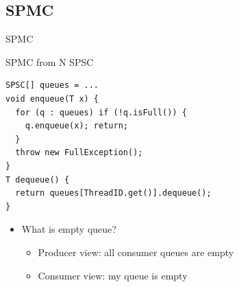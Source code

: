 \subsection{SPMC}
\showTOCSub

\begin{frame}[fragile]{SPMC}
\end{frame}


\begin{frame}[t,fragile]{SPMC from N SPSC}


\pause

\begin{verbatim}
SPSC[] queues = ...
void enqueue(T x) {
  for (q : queues) if (!q.isFull()) {
    q.enqueue(x); return;
  }
  throw new FullException();
}
T dequeue() {  
  return queues[ThreadID.get()].dequeue();  
}
\end{verbatim}

\pause
\begin{itemize}
  \item What is empty queue?
  \begin{itemize}
    \pause \item Producer view: all consumer queues are empty
    \pause \item Consumer view: my queue is empty
  \end{itemize}
\end{itemize}
\end{frame}

